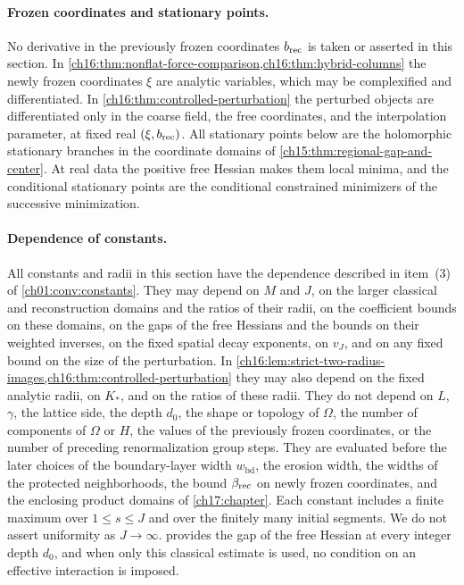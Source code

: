 \paragraph{Frozen coordinates and stationary points.}
No derivative in the previously frozen coordinates $b_{\mathrm{rec}}$ is taken or asserted in this section. In \cref{ch16:thm:nonflat-force-comparison,ch16:thm:hybrid-columns} the newly frozen coordinates $\xi$ are analytic variables, which may be complexified and differentiated. In \cref{ch16:thm:controlled-perturbation} the perturbed objects are differentiated only in the coarse field, the free coordinates, and the interpolation parameter, at fixed real $(\xi,b_{\mathrm{rec}})$. All stationary points below are the holomorphic stationary branches in the coordinate domains of \cref{ch15:thm:regional-gap-and-center}. At real data the positive free Hessian makes them local minima, and the conditional stationary points are the conditional constrained minimizers of the successive minimization.

\paragraph{Dependence of constants.}
All constants and radii in this section have the dependence described in item~(3) of \cref{ch01:conv:constants}. They may depend on $M$ and $J$, on the larger classical and reconstruction domains and the ratios of their radii, on the coefficient bounds on these domains, on the gaps of the free Hessians and the bounds on their weighted inverses, on the fixed spatial decay exponents, on $v_J$, and on any fixed bound on the size of the perturbation. In \cref{ch16:lem:strict-two-radius-images,ch16:thm:controlled-perturbation} they may also depend on the fixed analytic radii, on $K_*$, and on the ratios of these radii. They do not depend on $L$, $\gamma$, the lattice side, the depth $d_0$, the shape or topology of $\Omega$, the number of components of $\Omega$ or $H$, the values of the previously frozen coordinates, or the number of preceding renormalization group steps. They are evaluated before the later choices of the boundary-layer width $w_{\mathrm{bd}}$, the erosion width, the widths of the protected neighborhoods, the bound $\beta_{\mathrm{rec}}$ on newly frozen coordinates, and the enclosing product domains of \cref{ch17:chapter}. Each constant includes a finite maximum over $1\le s\le J$ and over the finitely many initial segments. We do not assert uniformity as $J\to\infty$.  provides the gap of the free Hessian at every integer depth $d_0$, and when only this classical estimate is used, no condition on an effective interaction is imposed.

